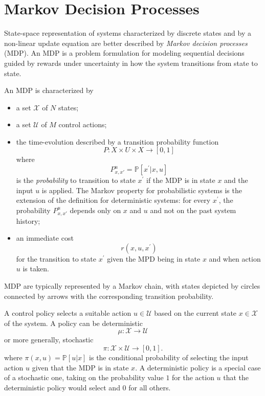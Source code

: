 \chapter{Markov Decision Processes}
\label{chap:markov-decision-processes}

State-space representation of systems characterized by discrete states and by a non-linear update equation are better described by \emph{Markov decision processes} (MDP). An MDP is a problem formulation for modeling sequential decisions guided by rewards under uncertainty in how the system transitions from state to state.

An MDP is characterized by
\begin{itemize}
\item a set $\mathcal{X}$ of $N$ states;
\item a set $\mathcal{U}$ of $M$ control actions;
\item the time-evolution described by a transition probability function
  \begin{equation*}
    P : X\times U\times X \rightarrow [0,1]
  \end{equation*}
  where
  \begin{equation*}
    P^u_{x,x\prime} = \mathbb{P}[x^\prime |x,u]
  \end{equation*}
  is the \emph{probability} to transition to state $x^\prime$ if the MDP is in state $x$ and the input $u$ is applied. The Markov property for probabilistic systems is the extension of the definition for deterministic systems: for every $x^\prime$, the probability $P^u_{x,x\prime}$ depends only on $x$ and $u$ and not on the past system history;
\item an immediate cost
  \begin{equation*}
    r(x,u,x^\prime)
  \end{equation*}
  for the transition to state $x^\prime$ given the MPD being in state $x$ and when action $u$ is taken.
\end{itemize}
MDP are typically represented by a Markov chain, with states depicted by circles connected by arrows with the corresponding transition probability.

A control policy selects a suitable action $u\in \mathcal{U}$ based on the current state $x\in \mathcal{X}$ of the system. A policy can be deterministic
\begin{equation*}
  \mu : \mathcal{X} \rightarrow \mathcal{U}
\end{equation*}
or more generally, stochastic
\begin{equation*}
  \pi : \mathcal{X} \times \mathcal{U} \rightarrow [0,1].
\end{equation*}
where $\pi(x,u) = \mathbb{P}[u|x]$ is the conditional probability of selecting the input action $u$ given that the MDP is in state $x$. A deterministic policy is a special case of a stochastic one, taking on the probability value $1$ for the action $u$ that the deterministic policy would select and $0$ for all others.

